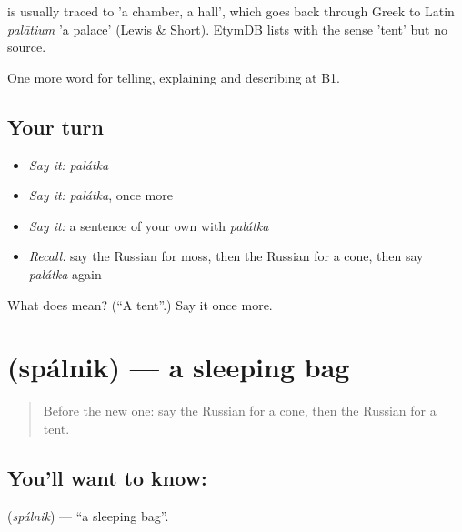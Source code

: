 \begin{cousinweb}
\emph{} is usually traced to \emph{} 'a chamber, a hall', which goes back through Greek to Latin \emph{palātium} 'a palace' (Lewis \& Short). EtymDB lists \emph{} with the sense 'tent' but no source.
\end{cousinweb}

\begin{grammarlens}[title={What you've built}]
One more word for telling, explaining and describing at B1.
\end{grammarlens}

\subsection*{Your turn}
\begin{itemize}
\raggedright
  \item \emph{Say it:} \emph{palátka}
  \item \emph{Say it:} \emph{palátka}, once more
  \item \emph{Say it:} a sentence of your own with \emph{palátka}
  \item \emph{Recall:} say the Russian for moss, then the Russian for a cone, then say \emph{palátka} again
\end{itemize}

\begin{tcolorbox}[breakable,colback=teal!4,colframe=teal!35!black,title={Before you move on}]
What does  mean? (\textquotedblleft{}A tent\textquotedblright{}.) Say it once more.
\end{tcolorbox}
\section[\texorpdfstring{\ru{спальник} (spálnik)}{спальник (spálnik)}]{ (spálnik) — a sleeping bag}

\label{lesson:RU-C462-spalnik}



\begin{quote}
Before the new one: say the Russian for a cone, then the Russian for a tent.
\end{quote}

\subsection*{You'll want to know: }
\textbf{} (\emph{spálnik}) — \textquotedblleft{}a sleeping bag\textquotedblright{}.

